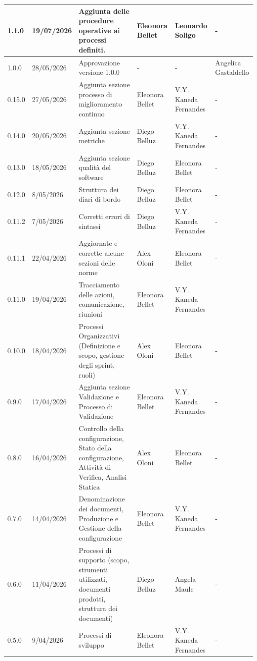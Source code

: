 \documentclass[a4paper,12pt]{article}
\begin{document}
{\begin{longtable}{|p{1.1cm}|p{2.0cm}|p{4.3cm}|p{2.8cm}|p{2.0cm}|p{2.0cm}|}
        \hline
        1.1.0 & 19/07/2026 & Aggiunta delle procedure operative ai processi definiti. & Eleonora Bellet & Leonardo Soligo & - \\
        \hline
        1.0.0 & 28/05/2026 & Approvazione versione 1.0.0 & - & - & Angelica Gastaldello \\
        \hline
        0.15.0 & 27/05/2026 & Aggiunta sezione processo di miglioramento continuo & Eleonora Bellet & V.Y. Kaneda Fernandes & - \\
        \hline
        0.14.0 & 20/05/2026 & Aggiunta sezione metriche & Diego Belluz & V.Y. Kaneda Fernandes & - \\
        \hline 
        0.13.0 & 18/05/2026 & Aggiunta sezione qualità del software & Diego Belluz & Eleonora Bellet & - \\
        \hline 
        0.12.0 & 8/05/2026 & Struttura dei diari di bordo & Diego Belluz & Eleonora Bellet & - \\
        \hline
        0.11.2 & 7/05/2026 & Corretti errori di sintassi & Diego Belluz & V.Y. Kaneda Fernandes & - \\
        \hline 
        0.11.1 & 22/04/2026 & Aggiornate e corrette alcune sezioni delle norme & Alex Oloni & Eleonora Bellet & - \\
        \hline 
        0.11.0 & 19/04/2026 & Tracciamento delle azioni, comunicazione, riunioni & Eleonora Bellet & V.Y. Kaneda Fernandes & - \\
        \hline
        0.10.0 & 18/04/2026 & Processi Organizzativi (Definizione e scopo, gestione degli sprint, ruoli) & Alex Oloni & Eleonora Bellet & - \\
        \hline 
        0.9.0 & 17/04/2026 & Aggiunta sezione Validazione e Processo di Validazione & Eleonora Bellet & V.Y. Kaneda Fernandes & - \\
        \hline 
        0.8.0 & 16/04/2026 & Controllo della configurazione, Stato della configurazione, Attività di Verifica, Analisi Statica & Alex Oloni & Eleonora Bellet & - \\
        \hline
        0.7.0 & 14/04/2026 & Denominazione dei documenti, Produzione e Gestione della configurazione & Eleonora Bellet & V.Y. Kaneda Fernandes & - \\
        \hline 
        0.6.0 & 11/04/2026 & Processi di supporto (scopo, strumenti utilizzati, documenti prodotti, struttura dei documenti) & Diego Belluz & Angela Maule & - \\
        \hline
        0.5.0 & 9/04/2026 & Processi di sviluppo & Eleonora Bellet & V.Y. Kaneda Fernandes & - \\

\end{longtable}}
\end{document}
